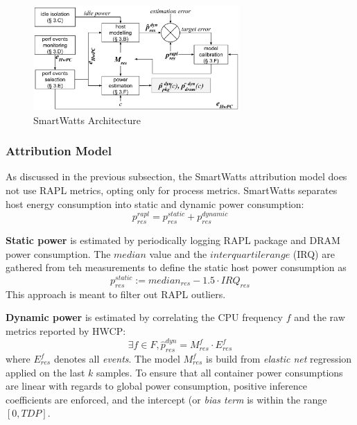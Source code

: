 \begin{figure}[ht]
    \centering
    \includegraphics[width=0.7\textwidth]{Figures/smartwatts_architecture.png}
    \caption[SmartWatts architecture]{SmartWatts Architecture}
    \label{fig:smartwatts_architecture}
\end{figure}
\subsubsection{Attribution Model}
\label{sec:smartwatts-attribution}
As discussed in the previous subsection, the SmartWatts attribution model does not use RAPL metrics, opting only for process metrics. SmartWatts separates host energy consumption into static and dynamic power consumption:
\begin{equation}
    p_{res}^{rapl} = p_{res}^{static} + p_{res}^{dynamic}
\end{equation}

\textbf{Static power} is estimated by periodically logging RAPL package and DRAM power consumption. The $median$ value and the $interquartile range$ (IRQ) are gathered from teh measurements to define the static host power consumption as 
\begin{equation}
    p_{res}^{static} := median_{res} - 1.5 \cdot IRQ_{res}
\end{equation}
This approach is meant to filter out RAPL outliers.

\textbf{Dynamic power} is estimated by correlating the CPU frequency $f$ and the raw metrics reported by HWCP:
\begin{equation}
    \exists f \in F, \hat{p}_{res}^{dyn} = M_{res}^{f} \cdot E_{res}^{f}
\end{equation}
where $E_{res}^{f}$ denotes all \textit{events}. The model $M_{res}^{f}$ is build from \textit{elastic net} regression applied on the last $k$ samples. To ensure that all container power consumptions are linear with regards to global power consumption, positive inference coefficients are enforced, and the intercept (or \textit{bias term} is within the range $[0, TDP]$.

